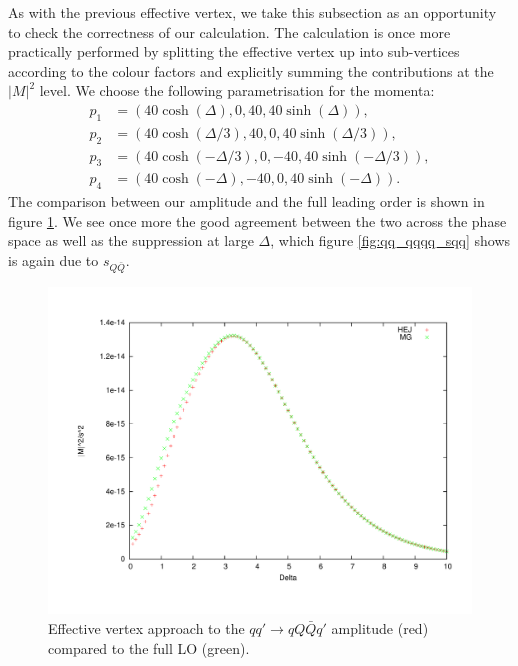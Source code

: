 As with the previous effective vertex, we take this subsection as an opportunity to check the correctness of our calculation. The calculation is once more practically performed by splitting the effective vertex up into sub-vertices according to the colour factors and explicitly summing the contributions at the $|M|^2$ level. We choose the following parametrisation for the momenta: 
\begin{equation}
\begin{split}
p_1 & = (40 \cosh(\Delta), 0, 40, 40 \sinh(\Delta)), \\
p_2 & = (40 \cosh(\Delta/3), 40, 0, 40 \sinh(\Delta/3)), \\
p_3 & = (40 \cosh(-\Delta/3), 0, -40, 40 \sinh(-\Delta/3)), \\
p_4 & = (40 \cosh(-\Delta), -40, 0, 40 \sinh(-\Delta)). 
\end{split}
\label{eqn:4jetmom}
\end{equation}
The comparison between our amplitude and the full leading order is shown in figure \ref{fig:qq_qqqq}. We see once more the good agreement between the two across the phase space as well as the suppression at large $\Delta$, which figure \ref{fig:qq_qqqq_sqq} shows is again due to $s_{Q \bar{Q}}$. 

\begin{figure}[H]
\centering
\includegraphics[scale=0.45]{Images/qQ_qqqxQ.pdf}
\caption{Effective vertex approach to the $qq' \to qQ\bar{Q}q'$ amplitude (red) compared to the full LO (green).}
\label{fig:qq_qqqq}
\end{figure}

